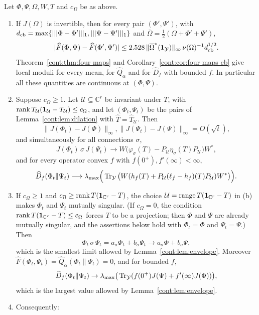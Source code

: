\begin{theorem}\label{cont:thm:dichotomy}
Let $\Phi,\Psi,\Omega,W,T$ and $c_\Omega$ be as above.
\begin{enumerate}
\item[(a)] If $J(\Omega)$ is invertible, then for every pair $(\Phi',\Psi')$, with $d_{\rm cb}=\max\{|||\Phi-\Phi'|||_1,|||\Psi-\Psi'|||_1\}$ and $\overline{\Omega}=\frac12(\Omega+\Phi'+\Psi')$,
\[
|\widehat F(\Phi,\Psi)-\widehat F(\Phi',\Psi')|\leq2.528\,\|\overline{\Omega}^*(\mathbf{1}_{\mathcal{Y}})\|_\infty\,\nu(\Omega)^{-1}d_{\rm cb}^{1/2}.
\]
Theorem~\ref{cont:thm:four maps} and Corollary~\ref{cont:cor:four maps cb} give local moduli for every mean, for $\widehat Q_\alpha$ and for $\widehat D_f$ with bounded $f$. In particular all these quantities are continuous at $(\Phi,\Psi)$.
\item[(b)] Suppose $c_\Omega\geq1$. Let $\mathcal{U}\subseteq\mathbb{C}^r$ be invariant under $T$, with $\operatorname{rank} T_{\mathcal{U}}(\mathbf{1}_{\mathcal{U}}-T_{\mathcal{U}})\leq c_\Omega$, and let $(\Phi_t,\Psi_t)$ be the pairs of Lemma~\ref{cont:lem:dilation} with $\widehat T=\widehat T_{\mathcal{U}}$. Then
\[
\|J(\Phi_t)-J(\Phi)\|_\infty,\|J(\Psi_t)-J(\Psi)\|_\infty=O(\sqrt t),
\]
and simultaneously for all connections $\sigma$,
\[
J(\Phi_t)\,\sigma\,J(\Psi_t)\longrightarrow W\big(\varphi_\sigma(T)-P_{\mathcal{U}}\eta_\sigma(T)P_{\mathcal{U}}\big)W^*,
\]
and for every operator convex $f$ with $f(0^+),f'(\infty)<\infty$,
\[
\widehat D_f(\Phi_t\|\Psi_t)\longrightarrow\lambda_{\max}\Big(\operatorname{Tr}_{\mathcal{Y}}\big(W(h_f(T)+P_{\mathcal{U}}(\ell_f-h_f)(T)P_{\mathcal{U}})W^*\big)\Big).
\]
\item[(c)] If $c_\Omega\geq1$ and $c_\Omega\geq\operatorname{rank} T(\mathbf{1}_{\mathbb{C}^r}-T)$, the choice $\mathcal{U}=\operatorname{range} T(\mathbf{1}_{\mathbb{C}^r}-T)$ in (b) makes $\Phi_t$ and $\Psi_t$ mutually singular. (If $c_\Omega=0$, the condition $\operatorname{rank} T(\mathbf{1}_{\mathbb{C}^r}-T)\leq c_\Omega$ forces $T$ to be a projection; then $\Phi$ and $\Psi$ are already mutually singular, and the assertions below hold with $\Phi_t=\Phi$ and $\Psi_t=\Psi$.) Then
\[
\Phi_t\,\sigma\,\Psi_t=a_\sigma\Phi_t+b_\sigma\Psi_t\to a_\sigma\Phi+b_\sigma\Psi,
\]
which is the smallest limit allowed by Lemma~\ref{cont:lem:envelope}. Moreover $\widehat F(\Phi_t,\Psi_t)=\widehat Q_\alpha(\Phi_t\|\Psi_t)=0$, and for bounded $f$,
\[
\widehat D_f(\Phi_t\|\Psi_t)\to\lambda_{\max}\big(\operatorname{Tr}_{\mathcal{Y}}(f(0^+)J(\Psi)+f'(\infty)J(\Phi))\big),
\]
which is the largest value allowed by Lemma~\ref{cont:lem:envelope}.
\item[(d)] Consequently:

\end{enumerate}
\end{theorem}
